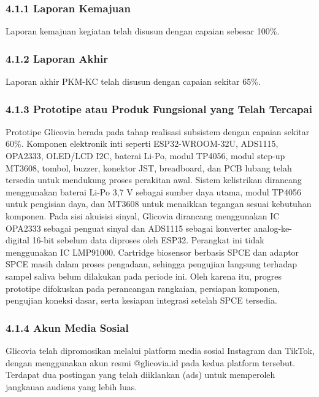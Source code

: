 \documentclass[12pt,a4paper]{article}
\begin{document}
\subsubsection*{4.1.1 Laporan Kemajuan}
Laporan kemajuan kegiatan telah disusun dengan capaian sebesar 100\%.

\subsubsection*{4.1.2 Laporan Akhir}
Laporan akhir PKM-KC telah disusun dengan capaian sekitar 65\%.

\subsubsection*{4.1.3 Prototipe atau Produk Fungsional yang Telah Tercapai}
Prototipe Glicovia berada pada tahap realisasi subsistem dengan capaian sekitar 60\%. Komponen elektronik inti seperti ESP32-WROOM-32U, ADS1115, OPA2333, OLED/LCD I2C, baterai Li-Po, modul TP4056, modul step-up MT3608, tombol, buzzer, konektor JST, breadboard, dan PCB lubang telah tersedia untuk mendukung proses perakitan awal. Sistem kelistrikan dirancang menggunakan baterai Li-Po 3,7 V sebagai sumber daya utama, modul TP4056 untuk pengisian daya, dan MT3608 untuk menaikkan tegangan sesuai kebutuhan komponen. Pada sisi akuisisi sinyal, Glicovia dirancang menggunakan IC OPA2333 sebagai penguat sinyal dan ADS1115 sebagai konverter analog-ke-digital 16-bit sebelum data diproses oleh ESP32. Perangkat ini tidak menggunakan IC LMP91000. Cartridge biosensor berbasis SPCE dan adaptor SPCE masih dalam proses pengadaan, sehingga pengujian langsung terhadap sampel saliva belum dilakukan pada periode ini. Oleh karena itu, progres prototipe difokuskan pada perancangan rangkaian, persiapan komponen, pengujian koneksi dasar, serta kesiapan integrasi setelah SPCE tersedia.

\subsubsection*{4.1.4 Akun Media Sosial}
Glicovia telah dipromosikan melalui platform media sosial Instagram dan TikTok, dengan menggunakan akun resmi @glicovia.id pada kedua platform tersebut. Terdapat dua postingan yang telah diiklankan (ads) untuk memperoleh jangkauan audiens yang lebih luas.
\end{document}
